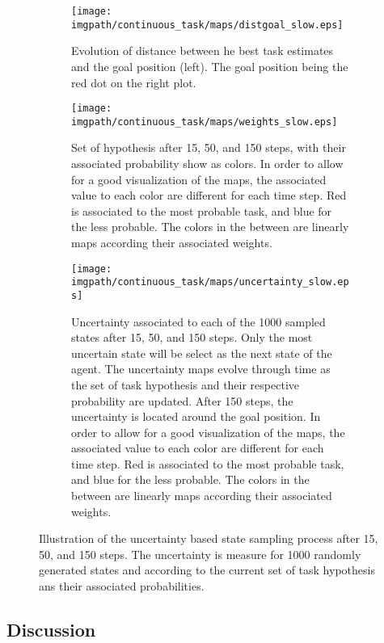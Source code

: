 \begin{figure}[!ht]
\centering
    \begin{subfigure}[b]{\columnwidth}
        \centering
        \texttt{[image: \\imgpath/continuous\_task/maps/distgoal\_slow.eps]}
        \caption{Evolution of distance between he best task estimates and the goal position (left). The goal position being the red dot on the right plot.}
        \label{fig:continuoustaskexampleslowdist}
    \end{subfigure}
    \begin{subfigure}[b]{\columnwidth}
        \centering
        \texttt{[image: \\imgpath/continuous\_task/maps/weights\_slow.eps]}
        \caption{Set of hypothesis after 15, 50, and 150 steps, with their associated probability show as colors. In order to allow for a good visualization of the maps, the associated value to each color are different for each time step. Red is associated to the most probable task, and blue for the less probable. The colors in the between are linearly maps according their associated weights.}
        \label{fig:continuoustaskexampleslowweights}
    \end{subfigure}
    \begin{subfigure}[b]{\columnwidth}
        \centering
        \texttt{[image: \\imgpath/continuous\_task/maps/uncertainty\_slow.eps]}
        \caption{Uncertainty associated to each of the 1000 sampled states after 15, 50, and 150 steps. Only the most uncertain state will be select as the next state of the agent. The uncertainty maps evolve through time as the set of task hypothesis and their respective probability are updated. After 150 steps, the uncertainty is located around the goal position. In order to allow for a good visualization of the maps, the associated value to each color are different for each time step. Red is associated to the most probable task, and blue for the less probable. The colors in the between are linearly maps according their associated weights.}
        \label{fig:continuoustaskexampleslowuncertainty}
    \end{subfigure}
\caption{Illustration of the uncertainty based state sampling process after 15, 50, and 150 steps. The uncertainty is measure for 1000 randomly generated states and according to the current set of task hypothesis ans their associated probabilities.}
\label{fig:continuoustasktasksamplingexampleslow}
\end{figure}

\subsection{Discussion}


